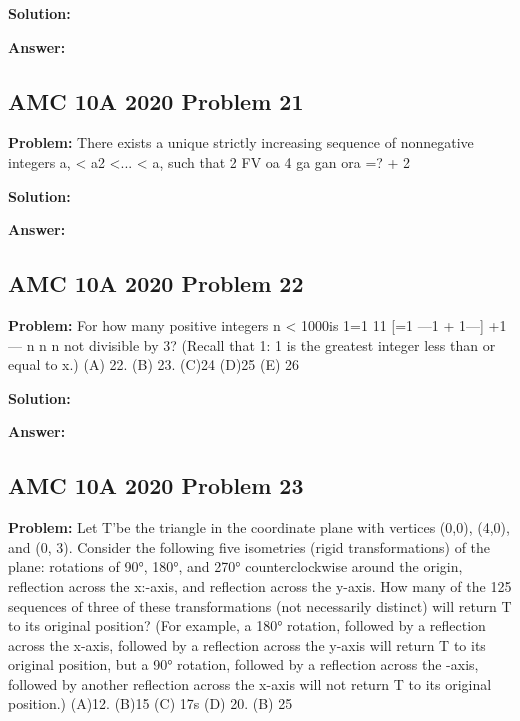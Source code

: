 \documentclass{article}
\newenvironment{problem}{\textbf{Problem: }}{\\}
\newenvironment{solution}{\textbf{Solution: }}{\\}
\newenvironment{answer}{\textbf{Answer: }}{\\}
\begin{document}
\begin{solution}
\end{solution}

\begin{answer}
\end{answer}

\subsection{AMC 10A 2020 Problem 21}

\begin{problem}
There exists a unique strictly increasing sequence of nonnegative integers a, < a2 <... < a, such that 2 FV oa 4 ga gan ora =? + 2%
\end{problem}

\begin{solution}
\end{solution}

\begin{answer}
\end{answer}

\subsection{AMC 10A 2020 Problem 22}

\begin{problem}
For how many positive integers n < 1000is 1=1 11 [=1 —1 + 1—] +1— n n n not divisible by 3? (Recall that 1: 1 is the greatest integer less than or equal to x.) (A) 22. (B) 23. (C)24 (D)25 (E) 26
\end{problem}

\begin{solution}
\end{solution}

\begin{answer}
\end{answer}

\subsection{AMC 10A 2020 Problem 23}

\begin{problem}
Let T’be the triangle in the coordinate plane with vertices (0,0), (4,0), and (0, 3). Consider the following five isometries (rigid transformations) of the plane: rotations of 90°, 180°, and 270° counterclockwise around the origin, reflection across the x:-axis, and reflection across the y-axis. How many of the 125 sequences of three of these transformations (not necessarily distinct) will return T to its original position? (For example, a 180° rotation, followed by a reflection across the x-axis, followed by a reflection across the y-axis will return T to its original position, but a 90° rotation, followed by a reflection across the -axis, followed by another reflection across the x-axis will not return T to its original position.) (A)12. (B)15 (C) 17s (D) 20. (B) 25
\end{problem}
\end{document}
